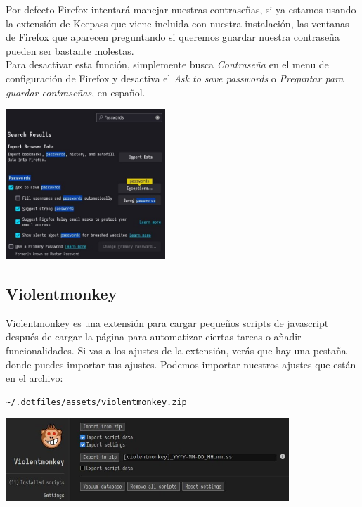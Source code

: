 \documentclass[12pt]{article}
\begin{document}
\begin{multicols}{2}
\begin{minipage}[t]{0.45\textwidth}
Por defecto Firefox intentará manejar nuestras contraseñas, si ya estamos usando la extensión de Keepass que viene incluida con nuestra instalación, las ventanas de Firefox que aparecen preguntando si queremos guardar nuestra contraseña pueden ser bastante molestas.
\vspace{10pt}\\
Para desactivar esta función, simplemente busca \emph{Contraseña} en el menu de configuración de Firefox y desactiva el \emph{Ask to save passwords} o \emph{Preguntar para guardar contraseñas}, en español.
\end{minipage}%
\hfill\includegraphics[width=0.45\textwidth]{images/passwords.jpg}
\end{multicols}

\subsection{Violentmonkey}

Violentmonkey es una extensión para cargar pequeños scripts de javascript después de cargar la página para automatizar ciertas tareas o añadir funcionalidades. Si vas a los ajustes de la extensión, verás que hay una pestaña donde puedes importar tus ajustes. Podemos importar nuestros ajustes que están en el archivo:

\begin{verbatim}
~/.dotfiles/assets/violentmonkey.zip
\end{verbatim}

\begin{center}
	\includegraphics[width=0.8\textwidth]{images/violentmonkey.jpg}
\end{center}
\end{document}
